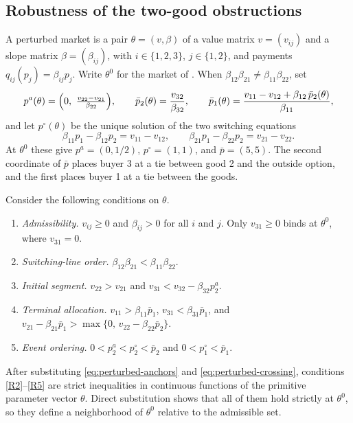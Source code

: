 \documentclass[11pt,a4paper,fleqn]{article}
\theoremstyle{plain}
\theoremstyle{definition}
\begin{document}
\subsection*{Robustness of the two-good obstructions}

A perturbed market is a pair $\theta=(v,\beta)$ of a value matrix $v=(v_{ij})$ and a slope matrix $\beta=(\beta_{ij})$, with $i\in\{1,2,3\}$, $j\in\{1,2\}$, and payments $q_{ij}(p_j)=\beta_{ij}p_j$. Write $\theta^0$ for the market of . When $\beta_{12}\beta_{21}\ne\beta_{11}\beta_{22}$, set
\begin{equation}\label{eq:perturbed-anchors}
p^a(\theta)=\Bigl(0,\ \tfrac{v_{22}-v_{21}}{\beta_{22}}\Bigr),
\qquad
\bar p_2(\theta)=\frac{v_{32}}{\beta_{32}},
\qquad
\bar p_1(\theta)=\frac{v_{11}-v_{12}+\beta_{12}\,\bar p_2(\theta)}{\beta_{11}},
\end{equation}
and let $p^\circ(\theta)$ be the unique solution of the two switching equations
\begin{equation}\label{eq:perturbed-crossing}
\beta_{11}p_1-\beta_{12}p_2=v_{11}-v_{12},
\qquad
\beta_{21}p_1-\beta_{22}p_2=v_{21}-v_{22}.
\end{equation}
At $\theta^0$ these give $p^a=(0,1/2)$, $p^\circ=(1,1)$, and $\bar p=(5,5)$. The second coordinate of $\bar p$ places buyer 3 at a tie between good 2 and the outside option, and the first places buyer 1 at a tie between the goods.

Consider the following conditions on $\theta$.
\begin{enumerate}[label=\textup{(R\arabic*)},leftmargin=3.1em]
\item\label{R1} \emph{Admissibility.} $v_{ij}\ge0$ and $\beta_{ij}>0$ for all $i$ and $j$. Only $v_{31}\ge0$ binds at $\theta^0$, where $v_{31}=0$.
\item\label{R2} \emph{Switching-line order.} $\beta_{12}\beta_{21}<\beta_{11}\beta_{22}$.
\item\label{R3} \emph{Initial segment.} $v_{22}>v_{21}$ and $v_{31}<v_{32}-\beta_{32}p^a_2$.
\item\label{R4} \emph{Terminal allocation.} $v_{11}>\beta_{11}\bar p_1$, $v_{31}<\beta_{31}\bar p_1$, and $v_{21}-\beta_{21}\bar p_1>\max\{0,\,v_{22}-\beta_{22}\bar p_2\}$.
\item\label{R5} \emph{Event ordering.} $0<p^a_2<p^\circ_2<\bar p_2$ and $0<p^\circ_1<\bar p_1$.
\end{enumerate}
After substituting \eqref{eq:perturbed-anchors} and \eqref{eq:perturbed-crossing}, conditions \ref{R2}--\ref{R5} are strict inequalities in continuous functions of the primitive parameter vector $\theta$. Direct substitution shows that all of them hold strictly at $\theta^0$, so they define a neighborhood of $\theta^0$ relative to the admissible set.
\end{document}
